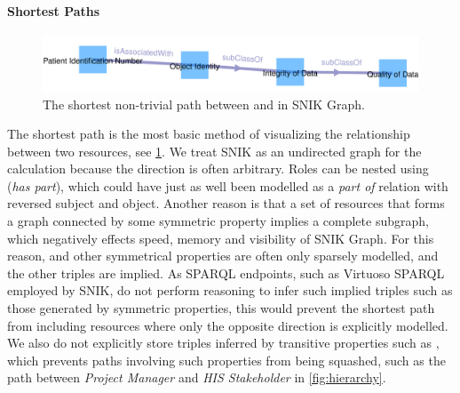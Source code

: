 \documentclass[conference]{IEEEtran}
\begin{document}
\paragraph{Shortest Paths}
\begin{figure}[h!]
    \centering
    \includegraphics[width=\columnwidth]{img/path.png}
    \caption{The shortest non-trivial path between  and  in SNIK Graph.}
	\label{fig:path}
\end{figure}
\vspace{-3pt}
The shortest path is the most basic method of visualizing the relationship between two resources, see \cref{fig:path}.
We treat SNIK as an undirected graph for the calculation because the direction is often arbitrary.
Roles can be nested using  (\emph{has part}), which could have just as well been modelled as a \emph{part of} relation with reversed subject and object.
Another reason is that a set of resources that forms a graph connected by some symmetric property implies a complete subgraph, which negatively effects speed, memory and visibility of SNIK Graph.
For this reason,  and other symmetrical properties are often only sparsely modelled, and the other triples are implied.
As SPARQL endpoints, such as Virtuoso SPARQL employed by SNIK, do not perform reasoning to infer such implied triples such as those generated by symmetric properties, this would prevent the shortest path from including resources where only the opposite direction is explicitly modelled.%
We also do not explicitly store triples inferred by transitive properties such as , which prevents paths involving such properties from being squashed, such as the path between \emph{Project Manager} and \emph{HIS Stakeholder} in \cref{fig:hierarchy}.
\end{document}
